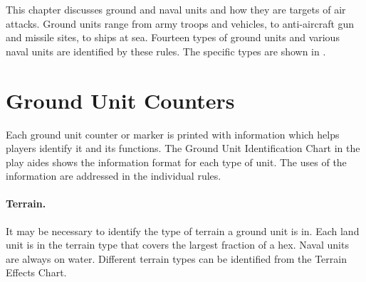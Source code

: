 


This chapter discusses ground and naval units and how they are targets of air attacks. Ground units range from army troops and vehicles, to anti-aircraft gun and missile sites, to ships at sea. Fourteen types of ground units and various naval units are identified by these rules. The specific types are shown in .

\section{Ground Unit Counters}

Each ground unit counter or marker is printed with information which helps players identify it and its functions. The Ground Unit Identification Chart in the play aides shows the information format for each type of unit. The uses of the information are addressed in the individual rules.

\paragraph{Terrain.} It may be necessary to identify the type of terrain a ground unit is in. Each land unit is in the terrain type that covers the largest fraction of a hex. Naval units are always on water. Different terrain types can be identified from the Terrain Effects Chart.

